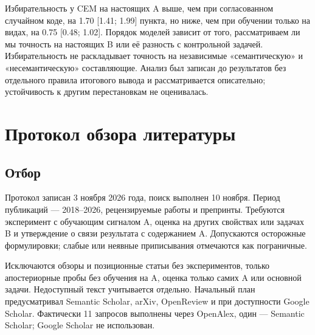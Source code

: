 Избирательность у CEM на настоящих A выше, чем при согласованном случайном коде, на 1.70 [1.41; 1.99] пункта, но ниже, чем при обучении только на видах, на 0.75 [0.48; 1.02]. Порядок моделей зависит от того, рассматриваем ли мы точность на настоящих B или её разность с контрольной задачей. Избирательность не раскладывает точность на независимые «семантическую» и «несемантическую» составляющие. Анализ был записан до результатов без отдельного правила итогового вывода и рассматривается описательно; устойчивость к другим перестановкам не оценивалась.

\section{Протокол обзора литературы}\label{app:review}

\subsection{Отбор}

Протокол записан 3 ноября 2026 года, поиск выполнен 10 ноября. Период публикаций — 2018–2026, рецензируемые работы и препринты. Требуются эксперимент с обучающим сигналом A, оценка на других свойствах или задачах B и утверждение о связи результата с содержанием A. Допускаются осторожные формулировки; слабые или неявные приписывания отмечаются как пограничные.

Исключаются обзоры и позиционные статьи без экспериментов, только апостериорные пробы без обучения на A, оценка только самих A или основной задачи. Недоступный текст учитывается отдельно. Начальный план предусматривал Semantic Scholar, arXiv, OpenReview и при доступности Google Scholar. Фактически 11 запросов выполнены через OpenAlex, один — Semantic Scholar; Google Scholar не использован.

